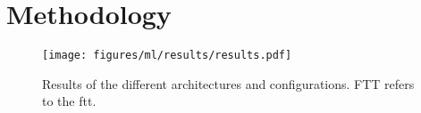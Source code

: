 \chapter{Methodology}
\label{ch:Methodology}







\begin{figure}
    \centering
    \texttt{[image: figures/ml/results/results.pdf]}
    \caption{Results of the different architectures and configurations. FTT refers to the \gls{ftt}.}
    \label{tab:results}
\end{figure}